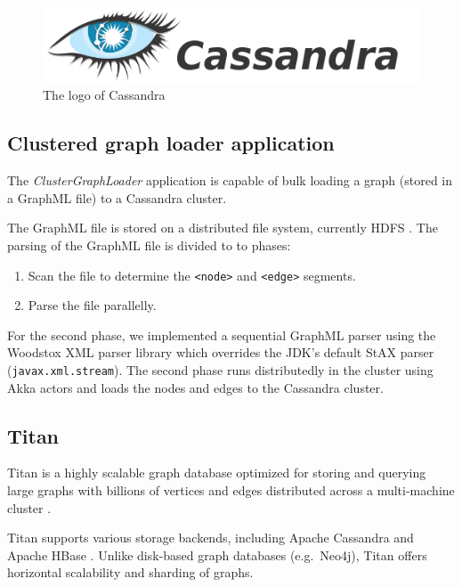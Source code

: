 \begin{figure}
\begin{center}
\includegraphics[]{figures/cassandra-logo}
\caption{The logo of Cassandra}
\label{fig:cassandra-logo}
\end{center}
\end{figure}


\subsection{Clustered graph loader application}

The \textit{ClusterGraphLoader} application is capable of bulk loading a graph (stored in a GraphML file) to a Cassandra cluster.

The GraphML file is stored on a distributed file system, currently HDFS \cite{hadoop}. The parsing of the GraphML file is divided to to phases:

\begin{enumerate}
  \item Scan the file to determine the \texttt{<node>} and \texttt{<edge>} segments.
  \item Parse the file parallelly.
\end{enumerate}

For the second phase, we implemented a sequential GraphML parser using the Woodstox XML parser library \cite{Woodstox} which overrides the JDK's default StAX parser (\texttt{javax.xml.stream}). The second phase runs distributedly in the cluster using Akka actors and loads the nodes and edges to the Cassandra cluster. 

\subsection{Titan}

Titan is a highly scalable graph database optimized for storing and querying large graphs with billions of vertices and edges distributed across a multi-machine cluster \cite{Titan, TitanRiseOfBigData, TitanCassandra}.

Titan supports various storage backends, including Apache Cassandra \cite{Cassandra} and Apache HBase \cite{HBase}. Unlike disk-based graph databases (e.g.\ Neo4j), Titan offers horizontal scalability and sharding of graphs.

